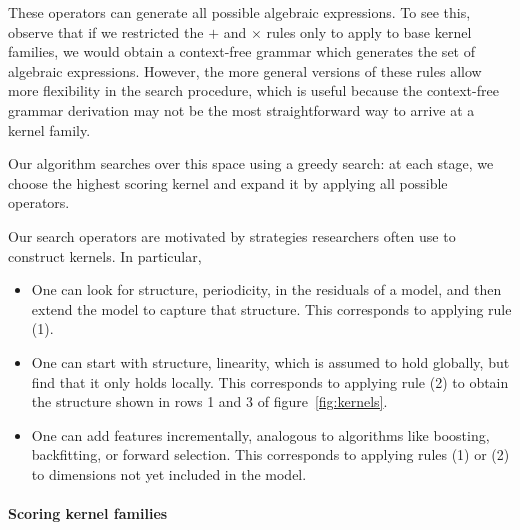 These operators can generate all possible algebraic expressions.
To see this, observe that if we restricted the $+$ and $\times$ rules only to apply to base kernel families, we would obtain a context-free grammar which generates the set of algebraic expressions.
However, the more general versions of these rules allow more flexibility in the search procedure, which is useful because the context-free grammar derivation may not be the most straightforward way to arrive at a kernel family.

Our algorithm searches over this space using a greedy search: at each stage, we choose the highest scoring kernel and expand it by applying all possible operators.

Our search operators are motivated by strategies researchers often use to construct kernels.
In particular,
\begin{itemize}
\item One can look for structure, \eg periodicity, in the residuals of a model, and then extend the model to capture that structure.
This corresponds to applying rule (1).
\item One can start with structure, \eg linearity, which is assumed to hold globally, but find that it only holds locally.
This corresponds to applying rule (2) to obtain the structure shown in rows 1 and 3 of figure~\ref{fig:kernels}.
\item One can add features incrementally, analogous to algorithms like boosting, backfitting, or forward selection.
This corresponds to applying rules (1) or (2) to dimensions not yet included in the model.
\end{itemize}

\paragraph{Scoring kernel families}

